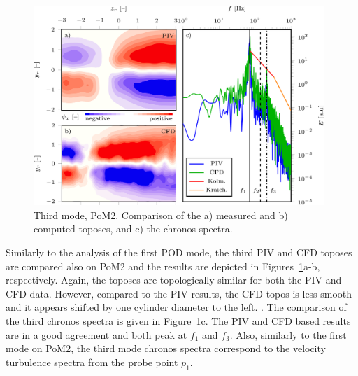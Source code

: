 {\begin{figure}[htbp]
    \centering
    \includegraphics[width=0.98\textwidth]{02_images/00_export/figure14.png}
    \caption{{Third mode, PoM2.} Comparison of the a) measured and b) computed toposes, and c) the chronos spectra.}
    \label{fig:pom2mod3}
\end{figure}
{Similarly to the analysis of the first POD mode}, the third PIV and CFD toposes are compared also on PoM2 {and the results are depicted} in Figures~\ref{fig:pom2mod3}a-b, respectively. Again, the {toposes are topologically} similar for both {the} PIV and CFD data. However, {compared to the PIV results,} the {CFD} topos is less smooth and it appears shifted by one cylinder diameter to the left. . The comparison of the third chronos spectra is given in Figure~\ref{fig:pom2mod3}c. The {PIV} and {CFD} {based results} are {in a good agreement and both} peak at $f_1$ and $f_3$. {Also,} similarly {to} the first mode on PoM2, {the third mode chronos spectra correspond} to the velocity turbulence spectra from {the} probe point $p_1$.



}
